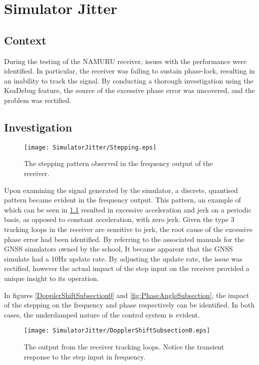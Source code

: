 \chapter{Simulator Jitter}
\label{ch:SimJitter}

\section{Context}
During the testing of the NAMURU receiver, issues with the performance were identified. In particular, the receiver was failing to sustain phase-lock, resulting in an inability to track the signal. By conducting a thorough investigation using the KeaDebug feature, the source of the excessive phase error was uncovered, and the problem was rectified. 

\section{Investigation}

\begin{figure}[!htb] 
    \centering
    \texttt{[image: SimulatorJitter/Stepping.eps]} 
    \caption{The stepping pattern observed in the frequency output of the receiver.}
    \label{fig:Stepping}
\end{figure}

Upon examining the signal generated by the simulator, a discrete, quantised pattern became evident in the frequency output. This pattern, an example of which can be seen in \ref{fig:Stepping} resulted in excessive acceleration and jerk on a periodic basis, as opposed to constant acceleration, with zero jerk. Given the type 3 tracking loops in the receiver are sensitive to jerk, the root cause of the excessive phase error had been identified. By referring to the associated manuals for the GNSS simulators owned by the school, It became apparent that the GNSS simulate had a 10Hz update rate. By adjusting the update rate, the issue was rectified, however the actual impact of the step input on the receiver provided a unique insight to its operation.

In figures \ref{DopplerShiftSubsection0} and \ref{fig:PhaseAngleSubsection}, the impact of the stepping on the frequency and phase respectively can be identified. In both cases, the underdamped nature of the control system is evident. 

\begin{figure}[!htb] 
    \centering
    \texttt{[image: SimulatorJitter/DopplerShiftSubsection0.eps]} 
    \caption{The output from the receiver tracking loops. Notice the transient response to the step input in frequency.}
    \label{fig:DopplerShiftSubsection0}
\end{figure}

